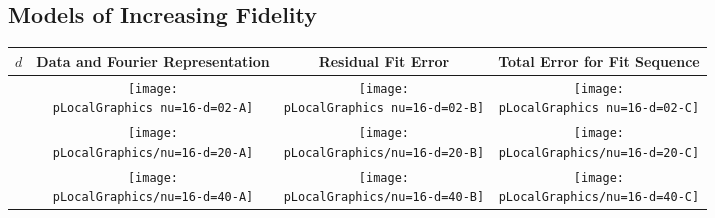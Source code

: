 % 



\subsection{Models of Increasing Fidelity}

%
\begin{table}
    \begin{center}
        \begin{tabular}{cccc}
            $d$ & Data and Fourier Representation & Residual Fit Error & Total Error for Fit Sequence \\\hline
            \raisebox{2.25cm}{$d=2$}
                & \texttt{[image: \\pLocalGraphics nu=16-d=02-A]}
                & \texttt{[image: \\pLocalGraphics nu=16-d=02-B]}
                & \texttt{[image: \\pLocalGraphics nu=16-d=02-C]} \\[5pt]
            \raisebox{2.25cm}{$d=20$}
                & \texttt{[image: \\pLocalGraphics/nu=16-d=20-A]}
                & \texttt{[image: \\pLocalGraphics/nu=16-d=20-B]}
                & \texttt{[image: \\pLocalGraphics/nu=16-d=20-C]} \\[5pt]
            \raisebox{2.25cm}{$d=40$}
                & \texttt{[image: \\pLocalGraphics/nu=16-d=40-A]}
                & \texttt{[image: \\pLocalGraphics/nu=16-d=40-B]}
                & \texttt{[image: \\pLocalGraphics/nu=16-d=40-C]} \\[5pt]
        \end{tabular}
    \end{center}
\end{table}
%

\endinput  %
